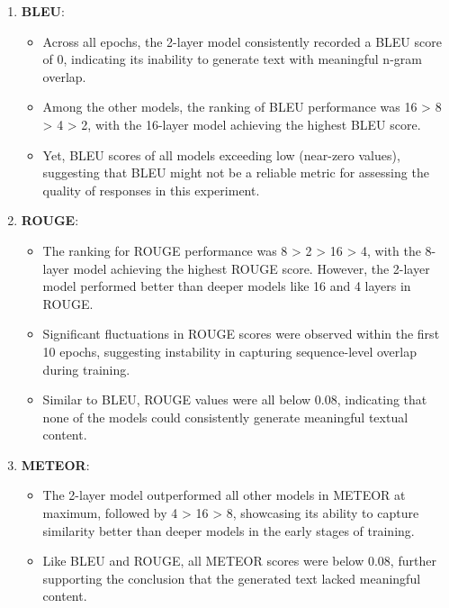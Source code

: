 \documentclass[11pt]{article}
\begin{document}
    \begin{enumerate}
        \item \textbf{BLEU}:
            \begin{itemize}
                \item Across all epochs, the 2-layer model consistently recorded a BLEU score of 0, indicating its inability to generate text with meaningful n-gram overlap.
                \item Among the other models, the ranking of BLEU performance was 16 > 8 > 4 > 2, with the 16-layer model achieving the highest BLEU score.
                \item Yet, BLEU scores of all models exceeding low (near-zero values), suggesting that BLEU might not be a reliable metric for assessing the quality of responses in this experiment.
            \end{itemize}
        \item \textbf{ROUGE}:
            \begin{itemize}
                \item The ranking for ROUGE performance was 8 > 2 > 16 > 4, with the 8-layer model achieving the highest ROUGE score. However, the 2-layer model performed better than deeper models like 16 and 4 layers in ROUGE.
                \item Significant fluctuations in ROUGE scores were observed within the first 10 epochs, suggesting instability in capturing sequence-level overlap during training.
                \item Similar to BLEU, ROUGE values were all below 0.08, indicating that none of the models could consistently generate meaningful textual content.
            \end{itemize}
        \item \textbf{METEOR}: 
            \begin{itemize}
                \item The 2-layer model outperformed all other models in METEOR at maximum, followed by 4 > 16 > 8, showcasing its ability to capture similarity better than deeper models in the early stages of training.
                \item Like BLEU and ROUGE, all METEOR scores were below 0.08, further supporting the conclusion that the generated text lacked meaningful content.
            \end{itemize}
    \end{enumerate}
\end{document}
